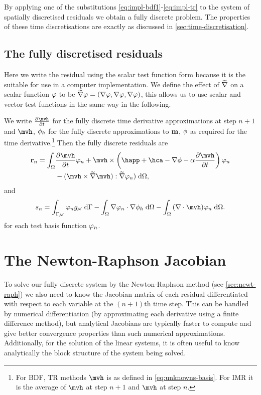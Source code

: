 {By applying one of the substitutions \cref{eq:impl-bdf1}-\cref{eq:impl-tr} to the system of spatially discretised residuals we obtain a fully discrete problem.
The properties of these time discretisations are exactly as discussed in \cref{sec:time-discretisation}.

\subsection{The fully discretised residuals}

Here we write the residual using the scalar test function form because it is the suitable for use in a computer implementation.
We define the effect of $\widetilde{\nabla}$ on a scalar function $\varphi$ to be $\widetilde{\nabla} \varphi = (\nabla \varphi, \nabla \varphi, \nabla \varphi)$, this allows us to use scalar and vector test functions in the same way in the following.

We write $\dmdth$ for the fully discrete time derivative approximations at step $n+1$ and $\mvh$, ${\phi}_h$ for the fully discrete approximations to $\boldsymbol{\mathrm{m}}$, $\phi$ as required for the time derivative.\footnote{For BDF, TR methods $\mvh$ is as defined in \cref{eq:unknowns-basis}. For IMR it is the average of $\mvh$ at step $n+1$ and $\mvh$ at step $n$.}
Then the fully discrete residuals are
\begin{equation}
  \label{res:llg-discrete}
  \begin{aligned}
    \rllgv_n = \int_{\magd}
    & \dmdth \tbf_n + \mvh \times \left( \happ + \hca - \grad \phi - \dampc \dmdth
    \right) \tbf_n \\
    &- (\mvh \times \gradv \mvh) : \gradv \tbf_n)
    \d\magd,
  \end{aligned}
\end{equation}
and
\begin{equation}
  \label{res:phi-discrete}
  \begin{aligned}
    \rphi_n = \int_{\boundd_\Neu} \tbf_n g_\Neu \d \boundd
    - \intd{ \grad \tbf_n \cdot \grad \phimh}
    - \intd{ (\div \mvh) \tbf_n}.
  \end{aligned}
\end{equation}
for each test basis function $\varphi_n$.

\section{The Newton-Raphson Jacobian}
\label{sec:llg-jacobian-calculation}

To solve our fully discrete system by the Newton-Raphson method (see \cref{sec:newt-raph}) we also need to know the Jacobian matrix of each residual differentiated with respect to each variable at the $(n+1)$th time step.
This can be handled by numerical differentiation (\eg by approximating each derivative using a finite difference method), but analytical Jacobians are typically faster to compute and give better convergence properties than such numerical approximations.
Additionally, for the solution of the linear systems, it is often useful to know analytically the block structure of the system being solved.

}
